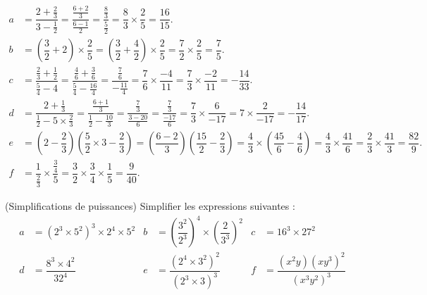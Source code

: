 \documentclass[12pt,
addpoints,
answers,
fleqn
]{exam}
\begin{document}
\begin{questions}
    \begin{solution}
        \begin{align*}
            a & = \dfrac{2+\frac{2}{3}}{3-\frac{1}{2}} = \dfrac{\frac{6+2}{3}}{\frac{6-1}{2}} = \dfrac{\frac{8}{3}}{\frac{5}{2}} = \dfrac{8}{3}\times\dfrac{2}{5} = \boxed{\dfrac{16}{15}}.                                                                                                                                \\
            b & =\left(\dfrac{3}{2}+2\right)\times \dfrac{2}{5} = \left(\dfrac{3}{2}+\dfrac{4}{2}\right)\times\dfrac{2}{5} = \dfrac{7}{2}\times \dfrac{2}{5} = \boxed{\dfrac{7}{5}}.                                                                                                                                       \\
            c & =\dfrac{\frac{2}{3}+\frac{1}{2}}{\frac{5}{4}-4} = \dfrac{\frac{4}{6}+\frac{3}{6}}{\frac{5}{4}-\frac{16}{4}}=\dfrac{\frac{7}{6}}{-\frac{11}{4}}=\dfrac{7}{6}\times\dfrac{-4}{11}=\dfrac{7}{3}\times\dfrac{-2}{11} = \boxed{-\dfrac{14}{33}}.                                                                \\
            d & =\dfrac{2+\frac{1}{3}}{\frac{1}{2}-5\times\frac{2}{3}} = \dfrac{\frac{6+1}{3}}{\frac{1}{2}-\frac{10}{3}}=\dfrac{\frac{7}{3}}{\frac{3-20}{6}}=\dfrac{\frac{7}{3}}{\frac{-17}{6}}=\dfrac{7}{3}\times \dfrac{6}{-17} = 7\times\dfrac{2}{-17}=\boxed{-\dfrac{14}{17}}.                                         \\
            e & =\left(2-\dfrac{2}{3}\right)\left(\dfrac{5}{2}\times 3 - \dfrac{2}{3}\right) = \left(\dfrac{6-2}{3}\right)\left(\dfrac{15}{2}-\dfrac{2}{3}\right) = \dfrac{4}{3}\times\left( \dfrac{45}{6}-\dfrac{4}{6}\right) = \dfrac{4}{3}\times\dfrac{41}{6} =\dfrac{2}{3}\times\dfrac{41}{3} = \boxed{\dfrac{82}{9}}. \\
            f & =\dfrac{1}{\frac{2}{3}}\times\dfrac{\frac{3}{4}}{5} = \dfrac{3}{2}\times\dfrac{3}{4}\times\dfrac{1}{5}= \boxed{\dfrac{9}{40}}.
        \end{align*}

    \end{solution}


    \question (Simplifications de puissances) Simplifier les expressions suivantes :
    \begin{align*}
        a & = \left(2^3\times 5^2\right)^3\times 2^4 \times 5^2 & b & =\left(\dfrac{3^2}{2^3}\right)^4\times\left(\dfrac{2}{3^3}\right)^2 & c & =16^3\times 27^2                                          \\
        d & =\dfrac{8^3\times 4^2}{32^4}                        & e & =\dfrac{\left(2^4\times 3^2\right)^2}{\left(2^3\times 3\right)^3}   & f & =\dfrac{(x^2y)\left(xy^3\right)^2}{\left(x^3y^2\right)^3}
    \end{align*}


\end{questions}
\end{document}
